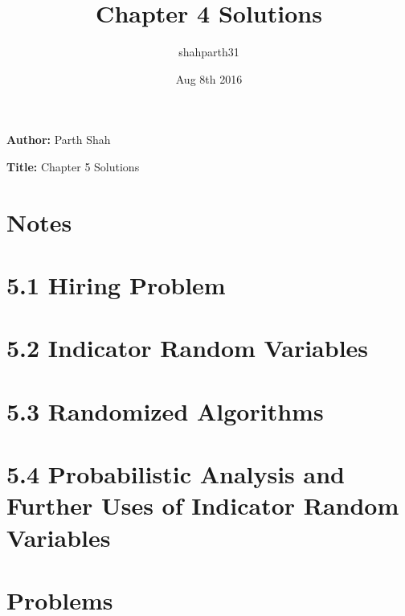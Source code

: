 \documentclass{article}
\title{Chapter 4 Solutions}
\author{shahparth31}
\date{Aug 8th 2016}
\begin{document}
\setlength{\parindent}{0pt}

\medskip

\hrulefill

\medskip

{\bf Author:} Parth Shah

\medskip

{\bf Title:} Chapter 5 Solutions

\hrulefill

\section*{Notes}


\section*{5.1 Hiring Problem}


\section*{5.2 Indicator Random Variables}


\section*{5.3 Randomized Algorithms}


\section*{5.4 Probabilistic Analysis and Further Uses of Indicator Random Variables}


\section*{Problems}
\end{document}
